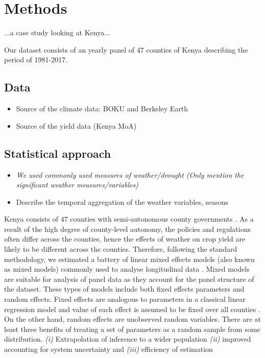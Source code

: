 \documentclass[12pt]{iopart}
\begin{document}
\section{Methods}\label{Methods}
\color{blue}

...a case study looking at Kenya...
\color{black}

Our dataset consists of an yearly panel of $47$ counties of Kenya describing the period of 1981-2017.
 
\subsection{Data}\label{Data}
\color{blue}
\begin{itemize}
\item Source of the climate data: BOKU and Berkeley Earth
\item Source of the yield data (Kenya MoA)
\end{itemize}

\color{black}
\subsection{Statistical approach}

\begin{itemize}
\color{blue}
\item \textit{We used commonly used measures of weather/drought (Only mention the significant weather measures/variables)}
\item Describe the temporal aggregation of the weather variables, seasons
\end{itemize}
\color{black}

\sloppy
Kenya consists of $47$ counties with semi-autonomous county governments  \cite{Barasa2017}. As a result of the high degree of county-level autonomy, the policies and regulations often differ across the counties, hence the effects of weather on crop yield are likely to be different across the counties. Therefore, following the standard methodology, we estimated a battery of linear mixed effects models (also known as mixed models) commonly used to analyse longitudinal data \cite{bates2000mixed}. Mixed models are suitable for analysis of panel data as they account for the panel structure of the dataset. These types of models include both fixed effects parameters and random effects. Fixed effects are analogous to parameters in a classical linear regression model and value of each effect is assumed to be fixed over all counties \cite{bates2010lme4}. On the other hand, random effects are unobserved random variables. There are at least three benefits of treating a set of parameters as a random sample from some distribution. \textit{(i)} Extrapolation of inference to a wider population \textit{(ii)} improved accounting for system uncertainty and \textit{(iii)} efficiency of estimation %
\end{document}
